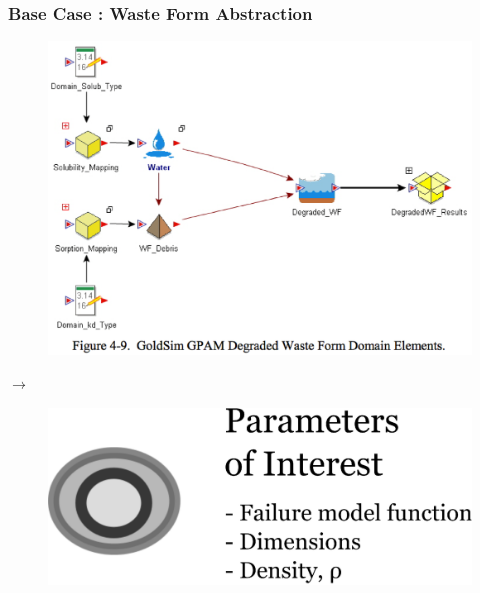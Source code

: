 \begin{frame}[ctb!]
  \frametitle{Base Case : Waste Form Abstraction}
  \begin{minipage}{0.45\textwidth}
    \begin{figure}[h!]
      \begin{center}
        \includegraphics[width=\textwidth]{./images/wf.eps}
      \end{center}
    \end{figure}
  \end{minipage}
  \hspace{0.01cm}\large{$\rightarrow$}\hspace{0.01cm}
  \begin{minipage}{0.45\textwidth}
    \begin{figure}[h!]
      \begin{center}
        \includegraphics[width=\textwidth]{./images/abstractionWF.eps}
      \end{center}
    \end{figure}
  \end{minipage}
\end{frame}

